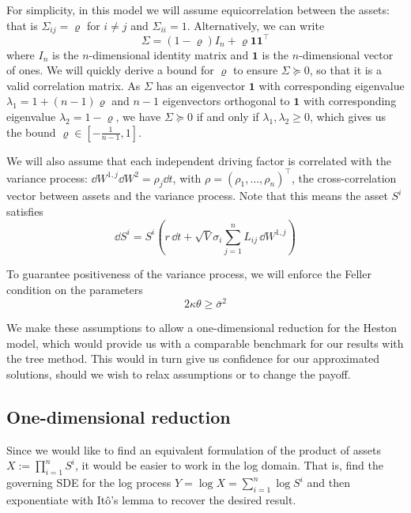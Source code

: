 For simplicity, in this model we will assume equicorrelation between the assets: that is $\Sigma_{ij} = \varrho$ for $i \ne j$ and $\Sigma_{ii} = 1$. Alternatively, we can write
\begin{equation}
    \Sigma = (1 - \varrho) I_n + \varrho \mathbf{1}\mathbf{1}^\top
\end{equation}
where $I_n$ is the $n$-dimensional identity matrix and $\mathbf{1}$ is the $n$-dimensional vector of ones. We will quickly derive a bound for $\varrho$ to ensure $\Sigma \succeq 0$, so that it is a valid correlation matrix. As $\Sigma$ has an eigenvector $\mathbf{1}$ with corresponding eigenvalue $\lambda_1 = 1 + (n-1)\varrho$ and $n-1$ eigenvectors orthogonal to $\mathbf{1}$ with corresponding eigenvalue $\lambda_2 = 1 - \varrho$, we have $\Sigma \succeq 0$ if and only if $\lambda_1, \lambda_2 \ge 0$, which gives us the bound $\varrho \in [-\frac 1{n-1}, 1]$.

We will also assume that each independent driving factor is correlated with the variance process: $\dd W^{1, j} \dd W^2 =\rho_j \dd t$, with $\rho = (\rho_1, \dots, \rho_n)^\top$, the cross-correlation vector between assets and the variance process. Note that this means the asset $S^i$ satisfies
\begin{equation}
    \dd S^i = S^i \left(r\,\dd t + \sqrt V \sigma_i \sum_{j=1}^n L_{ij}\,\dd W^{1, j}\right)
\end{equation}

To guarantee positiveness of the variance process, we will enforce the Feller condition on the parameters
\begin{equation}
    2\kappa\theta \ge \bar\sigma^2
\end{equation}

We make these assumptions to allow a one-dimensional reduction for the Heston model, which would provide us with a comparable benchmark for our results with the tree method. This would in turn give us confidence for our approximated solutions, should we wish to relax assumptions or to change the payoff.

\subsection{One-dimensional reduction}

Since we would like to find an equivalent formulation of the product of assets $X:= \prod_{i=1}^n S^i$, it would be easier to work in the log domain. That is, find the governing SDE for the log process $Y = \log X = \sum_{i=1}^n \log S^i$ and then exponentiate with Itô's lemma to recover the desired result.

